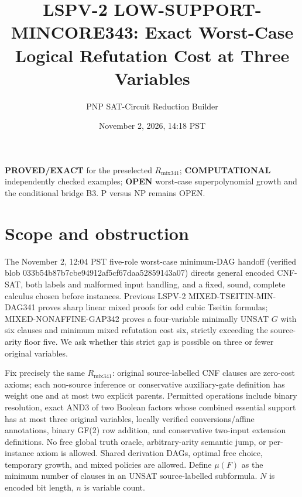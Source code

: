 \documentclass[11pt]{article}
\title{LSPV-2 LOW-SUPPORT-MINCORE343: Exact Worst-Case Logical Refutation Cost at Three Variables}
\author{PNP SAT-Circuit Reduction Builder}
\date{November 2, 2026, 14:18 PST}
\begin{document}
\maketitle
\noindent\textbf{PROVED/EXACT} for the preselected $R_{\mathrm{mix341}}$; \textbf{COMPUTATIONAL} independently checked examples; \textbf{OPEN} worst-case superpolynomial growth and the conditional bridge B3. P versus NP remains OPEN.

\section{Scope and obstruction}
The November 2, 12:04 PST five-role worst-case minimum-DAG handoff (verified blob 033b54b87b7cbe94912af5cf67daa52859143a07) directs general encoded CNF-SAT, both labels and malformed input handling, and a fixed, sound, complete calculus chosen before instances. Previous LSPV-2 MIXED-TSEITIN-MIN-DAG341 proves sharp linear mixed proofs for odd cubic Tseitin formulas; MIXED-NONAFFINE-GAP342 proves a four-variable minimally UNSAT $G$ with six clauses and minimum mixed refutation cost six, strictly exceeding the source-arity floor five. We ask whether this strict gap is possible on three or fewer original variables.

Fix precisely the same $R_{\mathrm{mix341}}$: original source-labelled CNF clauses are zero-cost axioms; each non-source inference or conservative auxiliary-gate definition has weight one and at most two explicit parents. Permitted operations include binary resolution, exact AND3 of two Boolean factors whose combined essential support has at most three original variables, locally verified conversions/affine annotations, binary GF(2) row addition, and conservative two-input extension definitions. No free global truth oracle, arbitrary-arity semantic jump, or per-instance axiom is allowed. Shared derivation DAGs, optimal free choice, temporary growth, and mixed policies are allowed. Define $\mu(F)$ as the minimum number of clauses in an UNSAT source-labelled subformula. $N$ is encoded bit length, $n$ is variable count.
\end{document}
